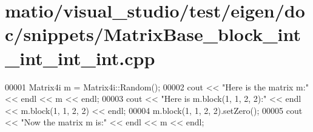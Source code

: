 \hypertarget{matio_2visual__studio_2test_2eigen_2doc_2snippets_2_matrix_base__block__int__int__int__int_8cpp_source}{}\section{matio/visual\+\_\+studio/test/eigen/doc/snippets/\+Matrix\+Base\+\_\+block\+\_\+int\+\_\+int\+\_\+int\+\_\+int.cpp}
\label{matio_2visual__studio_2test_2eigen_2doc_2snippets_2_matrix_base__block__int__int__int__int_8cpp_source}

\begin{DoxyCode}
00001 Matrix4i m = Matrix4i::Random();
00002 cout << \textcolor{stringliteral}{"Here is the matrix m:"} << endl << m << endl;
00003 cout << \textcolor{stringliteral}{"Here is m.block(1, 1, 2, 2):"} << endl << m.block(1, 1, 2, 2) << endl;
00004 m.block(1, 1, 2, 2).setZero();
00005 cout << \textcolor{stringliteral}{"Now the matrix m is:"} << endl << m << endl;
\end{DoxyCode}
